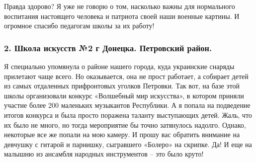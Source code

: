 
Правда здорово? Я уже не говорю о том, насколько важны для нормального
воспитания настоящего человека и патриота своей наши военные картины. И
огромное спасибо педагогам школы за их работу!

\subsubsection{2. Школа искусств №2 г Донецка. Петровский район.}

Я специально упомянула о районе нашего города, куда украинские снаряды
прилетают чаще всего. Но оказывается, она не прост работает, а собирает детей
из самых отдаленных прифронтовых уголков Петровки. Так вот, на базе этой школы
организовали конкурс «Волшебный мир искусства», в котором приняли участие более
200 маленьких музыкантов Республики. А я попала на подведение итогов конкурса и
была просто поражена таланту выступающих детей. Жаль, что их было не много, но
тогда мероприятие бы точно затянулось надолго. Однако, некоторые все же попали
на мою камеру. И прошу вас обратить внимание на девчушку с гитарой и парнишку,
сыгравшего «Болеро» на скрипке. Да! И еще на малышню из ансамбля народных
инструментов – это было круто!

